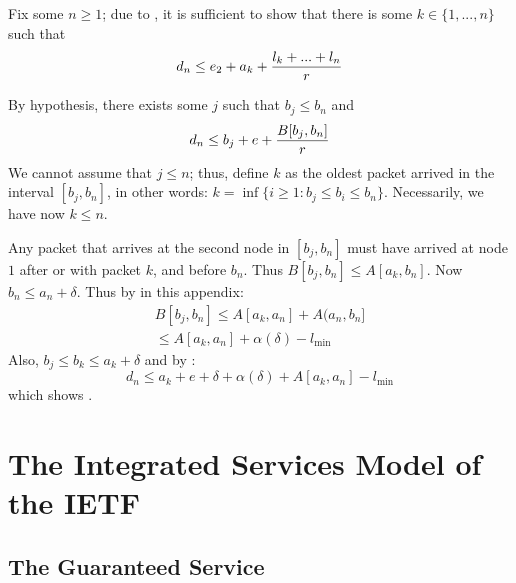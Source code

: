 Fix some $n \geq 1$; due to , it is
sufficient to show that  there is some $k \in \{1, ..., n\}$
 such that
\begin{equation}\mylabel{eq-gr2091a}
 d_n \leq e_2 + a_k + \frac{l_k + ... + l_n}{r}
\end{equation}

By hypothesis, there exists some $j$ such that $b_j \leq b_n$
and
\begin{equation}\mylabel{eq-kjsd82}
  d_n \leq b_j+ e + \frac{B[b_j, b_n]}{r}
\end{equation}
We cannot assume that $j \leq n$; thus, define $k$ as the
oldest packet arrived in the interval $[b_j, b_n]$, in other
words: $k=\inf\{i \geq 1: b_j \leq b_i \leq b_n \}$.
Necessarily, we have now $k \leq n$.

Any packet that arrives at the second node in $[b_j, b_n]$
must have arrived at node $1$ after or with packet $k$, and
before $b_n$. Thus $B[b_j, b_n] \leq A[a_k, b_n]$. Now $b_n
\leq a_n + \delta$. Thus by  in this
appendix:
$$
  \begin{array}{l}
   B[b_j, b_n] \leq A[a_k, a_n]+ A(a_n, b_n] \\
    \leq A[a_k, a_n] + \alpha(\delta) - l_{\min}
  \end{array}
$$
Also, $b_j \leq b_k \leq a_k + \delta$ and by
:
$$
d_n \leq a_k + e + \delta + \alpha(\delta) + A[a_k, a_n] -
l_{\min}
$$
which shows .




\section{The Integrated Services Model of the IETF}

\subsection{The Guaranteed Service}

